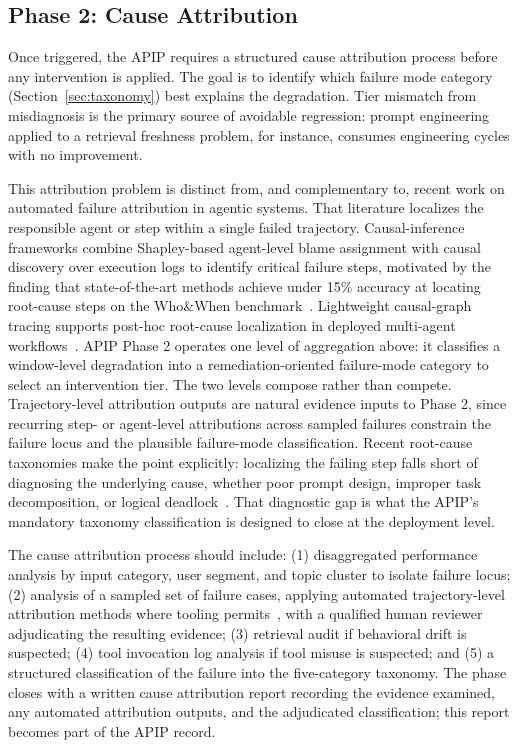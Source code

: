 \subsection{Phase 2: Cause Attribution}
\label{subsec:cause-attribution}

Once triggered, the APIP requires a structured cause attribution process before
any intervention is applied. The goal is to identify which failure mode
category (Section~\ref{sec:taxonomy}) best explains the degradation. Tier
mismatch from misdiagnosis is the primary source of avoidable regression: prompt
engineering applied to a retrieval freshness problem, for instance, consumes
engineering cycles with no improvement.

This attribution problem is distinct from, and complementary to, recent work on
automated failure attribution in agentic systems. That literature localizes the
responsible agent or step within a single failed trajectory. Causal-inference
frameworks combine Shapley-based agent-level blame assignment with causal
discovery over execution logs to identify critical failure steps, motivated by
the finding that state-of-the-art methods achieve under 15\% accuracy at
locating root-cause steps on the Who\&When
benchmark~\cite{ma2025attribution,zhang2025whichagent}. Lightweight causal-graph
tracing supports post-hoc root-cause localization in deployed multi-agent
workflows~\cite{agenttrace2026}. APIP Phase 2 operates one level of aggregation
above: it classifies a window-level degradation into a remediation-oriented
failure-mode category to select an intervention tier. The two levels compose
rather than compete. Trajectory-level attribution outputs are natural evidence
inputs to Phase 2, since recurring step- or agent-level attributions across
sampled failures constrain the failure locus and the plausible failure-mode
classification. Recent root-cause taxonomies make the point explicitly:
localizing the failing step falls short of diagnosing the underlying cause,
whether poor prompt design, improper task decomposition, or logical
deadlock~\cite{ma2025lifecycle}. That diagnostic gap is what the APIP's
mandatory taxonomy classification is designed to close at the deployment level.

The cause attribution process should include: (1) disaggregated performance
analysis by input category, user segment, and topic cluster to isolate failure
locus; (2) analysis of a sampled set of failure cases, applying automated
trajectory-level attribution methods where tooling
permits~\cite{ma2025attribution,agenttrace2026,zhu2026agentdebugx}, with a
qualified human reviewer adjudicating the resulting evidence; (3) retrieval
audit if behavioral drift is suspected; (4) tool invocation log analysis if tool
misuse is suspected; and (5) a structured classification of the failure into the
five-category taxonomy. The phase closes with a written cause attribution report
recording the evidence examined, any automated attribution outputs, and the
adjudicated classification; this report becomes part of the APIP record.


